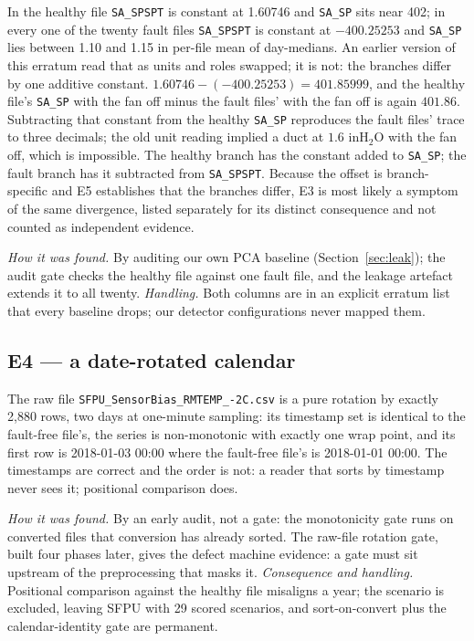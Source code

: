 \documentclass[runningheads]{llncs}
\begin{document}
In the healthy file \texttt{SA\_SPSPT} is constant at 1.60746 and \texttt{SA\_SP} sits near 402; in every one of the twenty fault files \texttt{SA\_SPSPT} is constant at $-400.25253$ and \texttt{SA\_SP} lies between 1.10 and 1.15 in per-file mean of day-medians. An earlier version of this erratum read that as units and roles swapped; it is not: the branches differ by one additive constant. $1.60746 - (-400.25253) = 401.85999$, and the healthy file's \texttt{SA\_SP} with the fan off minus the fault files' with the fan off is again $401.86$. Subtracting that constant from the healthy \texttt{SA\_SP} reproduces the fault files' trace to three decimals; the old unit reading implied a duct at $1.6$ inH$_2$O with the fan off, which is impossible. The healthy branch has the constant added to \texttt{SA\_SP}; the fault branch has it subtracted from \texttt{SA\_SPSPT}. Because the offset is branch-specific and E5 establishes that the branches differ, E3 is most likely a symptom of the same divergence, listed separately for its distinct consequence and not counted as independent evidence.

\emph{How it was found.} By auditing our own PCA baseline (Section~\ref{sec:leak}); the audit gate checks the healthy file against one fault file, and the leakage artefact extends it to all twenty. \emph{Handling.} Both columns are in an explicit erratum list that every baseline drops; our detector configurations never mapped them.


\subsection{E4 --- a date-rotated calendar}

The raw file \texttt{SFPU\_SensorBias\_RMTEMP\_-2C.csv} is a pure rotation by exactly 2{,}880 rows, two days at one-minute sampling: its timestamp set is identical to the fault-free file's, the series is non-monotonic with exactly one wrap point, and its first row is 2018-01-03 00:00 where the fault-free file's is 2018-01-01 00:00. The timestamps are correct and the order is not: a reader that sorts by timestamp never sees it; positional comparison does.

\emph{How it was found.} By an early audit, not a gate: the monotonicity gate runs on converted files that conversion has already sorted. The raw-file rotation gate, built four phases later, gives the defect machine evidence: a gate must sit upstream of the preprocessing that masks it. \emph{Consequence and handling.} Positional comparison against the healthy file misaligns a year; the scenario is excluded, leaving SFPU with 29 scored scenarios, and sort-on-convert plus the calendar-identity gate are permanent.
\end{document}
